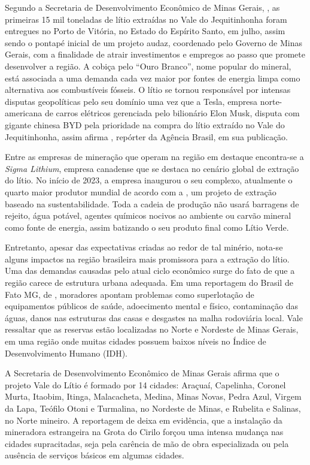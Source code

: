 Segundo a Secretaria de Desenvolvimento Econômico de Minas Gerais, , as primeiras 15 mil toneladas de lítio extraídas no Vale do Jequitinhonha foram entregues no Porto de Vitória, no Estado do Espírito Santo, em julho, assim sendo o pontapé inicial de um projeto audaz, coordenado pelo Governo de Minas Gerais, com a finalidade de atrair investimentos e empregos ao passo que promete desenvolver a região. A cobiça pelo ``Ouro Branco'', nome popular do mineral, está associada a uma demanda cada vez maior por fontes de energia limpa como alternativa aos combustíveis fósseis. O lítio se tornou responsável por intensas disputas geopolíticas pelo seu domínio uma vez que a Tesla, empresa norte-americana de carros elétricos gerenciada pelo bilionário Elon Musk, disputa com gigante chinesa BYD pela prioridade na compra do lítio extraído no Vale do Jequitinhonha, assim afirma , repórter da Agência Brasil, em sua publicação.

Entre as empresas de mineração que operam na região em destaque encontra-se a \textit{Sigma Lithium}, empresa canadense que se destaca no cenário global de extração do lítio. No início de 2023, a empresa inaugurou o seu complexo, atualmente o quarto maior produtor mundial de acordo com a , um projeto de extração baseado na sustentabilidade. Toda a cadeia de produção não usará barragens de rejeito, água potável, agentes químicos nocivos ao ambiente ou carvão mineral como fonte de energia, assim batizando o seu produto final como Lítio Verde.

Entretanto, apesar das expectativas criadas ao redor de tal minério, nota-se alguns impactos na região brasileira mais promissora para a extração do lítio. Uma das demandas causadas pelo atual ciclo econômico surge do fato de que a região carece de estrutura urbana adequada. Em uma reportagem do Brasil de Fato MG, de , moradores apontam problemas como superlotação de equipamentos públicos de saúde, adoecimento mental e físico, contaminação das águas, danos nas estruturas das casas e desgastes na malha rodoviária local. Vale ressaltar que as reservas estão localizadas no Norte e Nordeste de Minas Gerais, em uma região onde muitas cidades possuem baixos níveis no Índice de Desenvolvimento Humano (IDH).

A Secretaria de Desenvolvimento Econômico de Minas Gerais afirma que o projeto Vale do Lítio é formado por 14 cidades: Araçuaí, Capelinha, Coronel Murta, Itaobim, Itinga, Malacacheta, Medina, Minas Novas, Pedra Azul, Virgem da Lapa, Teófilo Otoni e Turmalina, no Nordeste de Minas, e Rubelita e Salinas, no Norte mineiro. A reportagem de  deixa em evidência, que a instalação da mineradora estrangeira na Grota do Cirilo forçou uma intensa mudança nas cidades supracitadas, seja pela carência de mão de obra especializada ou pela ausência de serviços básicos em algumas cidades.

